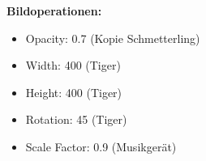 \textbf{Bildoperationen:}
\begin{itemize}
	\item Opacity: 0.7 (Kopie Schmetterling)
	\item Width: 400 (Tiger)
	\item Height: 400 (Tiger)
	\item Rotation: 45 (Tiger)
	\item Scale Factor: 0.9 (Musikgerät)
\end{itemize}

